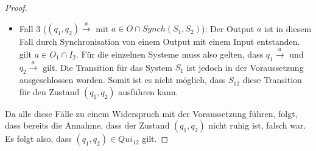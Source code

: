\begin{proof}
\begin{itemize}
    \item Fall 3 ($(q_1,q_2) \overset{a}{\rightarrow}$ mit $a\in O\cap
      Synch(S_1,S_2)$): Der Output $a$ ist in diesem Fall durch Synchronisation
      von einem Output mit einem Input entstanden. \OBdA{} gilt $a\in O_1\cap
      I_2$. Für die einzelnen Systeme muss also gelten, dass $q_1
      \overset{a}{\rightarrow}$ und $q_2 \overset{a}{\rightarrow}$ gilt. Die
      Transition für das System $S_1$ ist jedoch in der Voraussetzung
      ausgeschlossen worden. Somit ist es nicht möglich, dass $S_{12}$ diese
      Transition für den Zustand $(q_1,q_2)$ ausführen kann.
  \end{itemize}
  Da alle diese Fälle zu einem Widerspruch mit der Voraussetzung führen, folgt,
  dass bereits die Annahme, dass der Zustand $(q_1,q_2)$ nicht ruhig ist,
  falsch war. Es folgt also, dass $(q_1,q_2)\in Qui_{12}$ gilt.


\end{proof}
